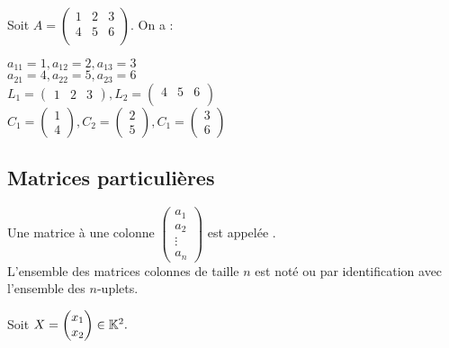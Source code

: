 \documentclass{book}
\begin{document}
\begin{Exemple}
Soit $A=\begin{pmatrix}1&2&3 \\4&5&6\\ \end{pmatrix}$. On a :
\begin{center}
$a_{11} = 1, a_{12} = 2, a_{13} = 3$\\
$a_{21} = 4, a_{22} = 5, a_{23} = 6$\\
$L_1=\begin{pmatrix}1&2&3 \end{pmatrix}, L_2=\begin{pmatrix}4&5&6\\ \end{pmatrix}$\\
$C_1=\begin{pmatrix}1\\4 \end{pmatrix}, C_2=\begin{pmatrix}2\\5 \end{pmatrix} , C_1=\begin{pmatrix}3\\6 \end{pmatrix}$
\end{center}
\end{Exemple}
\subsection{Matrices particulières}

\begin{Definition}
Une matrice à une colonne $\begin{pmatrix}a_1\\a_2\\ \vdots\\a_n \end{pmatrix}$ est appelée .\\
L'ensemble des matrices colonnes de taille $n$ est noté  ou   par identification avec l'ensemble des $n$-uplets.
\end{Definition}
\begin{Exemple}
Soit $X=\begin{pmatrix}x_1\\x_2\\\end{pmatrix}\in\mathbb{K}^2.$
\end{Exemple}
\end{document}
